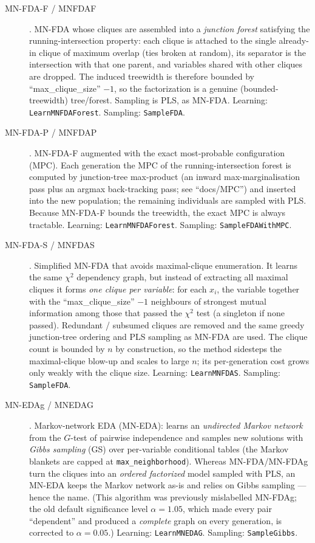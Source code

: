 \documentclass[a4paper,11pt]{article}
\begin{document}
\begin{description}
  \item[MN-FDA-F / MNFDAF] \citep{Santana:2003c}.
    MN-FDA whose cliques are assembled into a \emph{junction forest} satisfying
    the running-intersection property: each clique is attached to the single
    already-in clique of maximum overlap (ties broken at random), its separator
    is the intersection with that one parent, and variables shared with other
    cliques are dropped.  The induced treewidth is therefore bounded by
    ``max\_clique\_size'' $-1$, so the factorization is a genuine
    (bounded-treewidth) tree/forest.  Sampling is PLS, as MN-FDA.
    Learning: \texttt{LearnMNFDAForest}. Sampling: \texttt{SampleFDA}.

  \item[MN-FDA-P / MNFDAP] \citep{Santana:2003c}.
    MN-FDA-F augmented with the exact most-probable configuration (MPC).  Each
    generation the MPC of the running-intersection forest is computed by
    junction-tree max-product (an inward max-marginalisation pass plus an argmax
    back-tracking pass; see ``docs/MPC'') and inserted into the new population;
    the remaining individuals are sampled with PLS.  Because MN-FDA-F bounds the
    treewidth, the exact MPC is always tractable.
    Learning: \texttt{LearnMNFDAForest}. Sampling: \texttt{SampleFDAWithMPC}.

  \item[MN-FDA-S / MNFDAS] \citep{Santana:2003c}.
    Simplified MN-FDA that avoids maximal-clique enumeration. It learns the same
    $\chi^2$ dependency graph, but instead of extracting all maximal cliques it
    forms \emph{one clique per variable}: for each $x_i$, the variable together
    with the ``max\_clique\_size'' $-1$ neighbours of strongest mutual
    information among those that passed the $\chi^2$ test (a singleton if none
    passed). Redundant / subsumed cliques are removed and the same greedy
    junction-tree ordering and PLS sampling as MN-FDA are used. The clique count
    is bounded by $n$ by construction, so the method sidesteps the maximal-clique
    blow-up and scales to large $n$; its per-generation cost grows only weakly
    with the clique size.
    Learning: \texttt{LearnMNFDAS}. Sampling: \texttt{SampleFDA}.

  \item[MN-EDAg / MNEDAG] \citep{Santana:2005}.
    Markov-network EDA (MN-EDA): learns an \emph{undirected Markov network} from
    the $G$-test of pairwise independence and samples new solutions with
    \emph{Gibbs sampling} (GS) over per-variable conditional tables (the Markov
    blankets are capped at \texttt{max\_neighborhood}). Whereas MN-FDA/MN-FDAg
    turn the cliques into an \emph{ordered factorized} model sampled with PLS, an
    MN-EDA keeps the Markov network as-is and relies on Gibbs sampling ---
    hence the name. (This algorithm was previously mislabelled MN-FDAg; the old
    default significance level $\alpha=1.05$, which made every pair
    ``dependent'' and produced a \emph{complete} graph on every generation, is
    corrected to $\alpha=0.05$.)
    Learning: \texttt{LearnMNEDAG}. Sampling: \texttt{SampleGibbs}.


\end{description}
\end{document}
